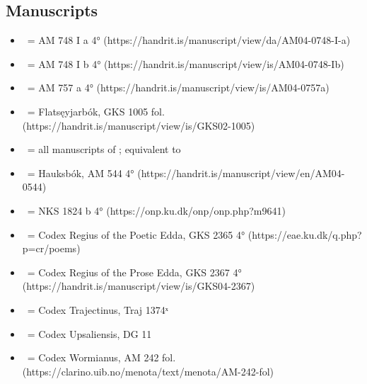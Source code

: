 \subsection{Manuscripts}
\begin{itemize}%
	\item \AM\ = AM 748 I a 4° (https://handrit.is/manuscript/view/da/AM04-0748-I-a)
	\item \AMb\ = AM 748 I b 4° (https://handrit.is/manuscript/view/is/AM04-0748-Ib)
	\item \EddaBms\ = AM 757 a 4° (https://handrit.is/manuscript/view/is/AM04-0757a)
	\item \FlatMS\ = Flatsęyjarbók, GKS 1005 fol. (https://handrit.is/manuscript/view/is/GKS02-1005)
	\item \GylfMS\ = all manuscripts of \Gylfaginning; equivalent to \RegiusProse\Trajectinus\Upsaliensis\Wormianus
	\item \Hauksbok\ = Hauksbók, AM 544 4° (https://handrit.is/manuscript/view/en/AM04-0544)
	\item \VolsungaMS\ = NKS 1824 b 4° (https://onp.ku.dk/onp/onp.php?m9641)
	\item \Regius\ = Codex Regius of the Poetic Edda, GKS 2365 4° (https://eae.ku.dk/q.php?p=cr/poems)
	\item \RegiusProse\ = Codex Regius of the Prose Edda, GKS 2367 4° (https://handrit.is/manuscript/view/is/GKS04-2367)
	\item \Trajectinus\ = Codex Trajectinus, Traj 1374ˣ
	\item \Upsaliensis\ = Codex Upsaliensis, DG 11
	\item \Wormianus\ = Codex Wormianus, AM 242 fol. (https://clarino.uib.no/menota/text/menota/AM-242-fol)
\end{itemize}

\newcommand{\Drottkvett}{%
	\emph{Court-recited meter}%
}
\newcommand{\Fornyrdislag}{%
	\emph{Ancient-words-law}%
}
\newcommand{\Galdralag}{%
	\emph{Galders-law}%
}
\newcommand{\Ljodahattr}{%
	\emph{Leeds-meter}%
}
\newcommand{\Malahattr}{%
	\emph{Speeches-meter}%
}

\newcommand{\CV}{%
	\textciteshorttitle{CleasbyVigfusson}%
}
\newcommand{\FGT}{%
	\textciteshorttitle{FGTHaugen}%
}
\newcommand{\ONP}{%
	\emph{ONP}%
}
\newcommand{\Skp}{%
	\textciteshorttitle{SkP}%
}
